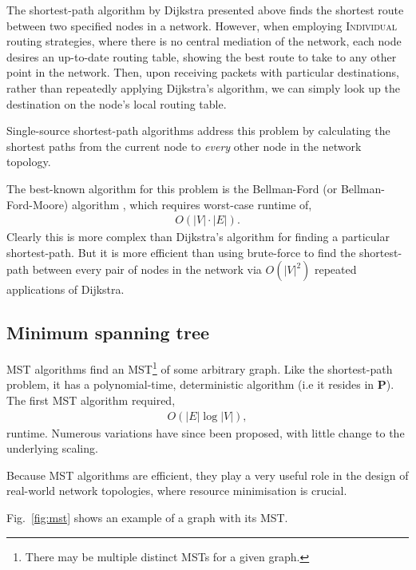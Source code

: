 The shortest-path algorithm by Dijkstra presented above finds the shortest route between two specified nodes in a network. However, when employing \textsc{Individual} routing strategies, where there is no central mediation of the network, each node desires an up-to-date routing table, showing the best route to take to any other point in the network. Then, upon receiving packets with particular destinations, rather than repeatedly applying Dijkstra's algorithm, we can simply look up the destination on the node's local routing table.

Single-source shortest-path algorithms address this problem by calculating the shortest paths from the current node to \textit{every} other node in the network topology.

The best-known algorithm for this problem is the Bellman-Ford (or Bellman-Ford-Moore) algorithm \cite{BF}, which requires worst-case runtime of,
\begin{align}
	O(|V|\cdot |E|).
\end{align}
Clearly this is more complex than Dijkstra's algorithm for finding a particular shortest-path. But it is more efficient than using brute-force to find the shortest-path between every pair of nodes in the network via $O(|V|^2)$ repeated applications of Dijkstra.

%
%

\subsection{Minimum spanning tree} \label{sec:min_tree} 

MST algorithms find an MST\footnote{There may be multiple distinct MSTs for a given graph.} of some arbitrary graph. Like the shortest-path problem, it has a polynomial-time, deterministic algorithm (i.e it resides in \textbf{P}). The first MST algorithm \cite{bib:Boruvka26} required,
\begin{align}
	O(|E|\log |V|),
\end{align}
runtime. Numerous variations have since been proposed, with little change to the underlying scaling.

Because MST algorithms are efficient, they play a very useful role in the design of real-world network topologies, where resource minimisation is crucial.

Fig.~\ref{fig:mst} shows an example of a graph with its MST.

